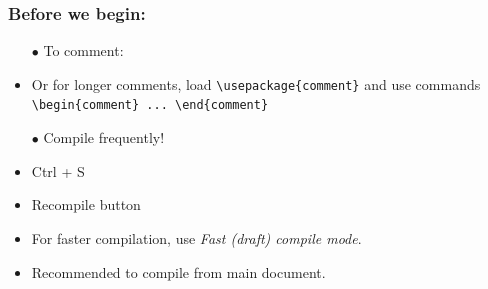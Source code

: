 % 


\begin{frame}[fragile]
\frametitle{Before we begin:}
\begin{itemize}
    \item[$\bullet$] To comment: 
    \item Or for longer comments, load \verb|\usepackage{comment}| and use commands \verb|\begin{comment} ... \end{comment}|
    \item[$\bullet$] Compile frequently!
    \item Ctrl + S
    \item Recompile button
    \item For faster compilation, use \textit{Fast (draft) compile mode}.
    \item Recommended to compile from main document.
\end{itemize}
\end{frame}

